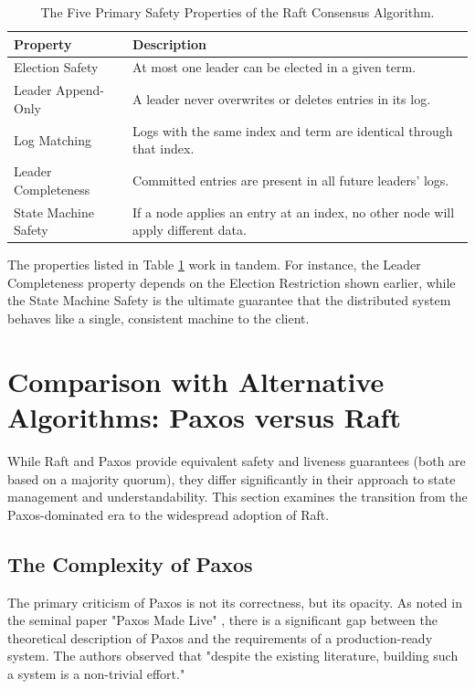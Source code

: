 \begin{table}[h]
\centering
\caption{The Five Primary Safety Properties of the Raft Consensus Algorithm.}
\label{tab:raft_safety_properties}
\begin{tabular}{|l|l|}
\hline
\textbf{Property} & \textbf{Description} \\ \hline
Election Safety & At most one leader can be elected in a given term. \\ \hline
Leader Append-Only & A leader never overwrites or deletes entries in its log. \\ \hline
Log Matching & Logs with the same index and term are identical through that index. \\ \hline
Leader Completeness & Committed entries are present in all future leaders' logs. \\ \hline
State Machine Safety & If a node applies an entry at an index, no other node will apply different data. \\ \hline
\end{tabular}
\end{table}

The properties listed in Table \ref{tab:raft_safety_properties} work in tandem. For instance, the Leader Completeness property depends on the Election Restriction shown earlier, while the State Machine Safety is the ultimate guarantee that the distributed system behaves like a single, consistent machine to the client.

\section{Comparison with Alternative Algorithms: Paxos versus Raft}
While Raft and Paxos provide equivalent safety and liveness guarantees (both are based on a majority quorum), they differ significantly in their approach to state management and understandability. This section examines the transition from the Paxos-dominated era to the widespread adoption of Raft.

\subsection{The Complexity of Paxos}
The primary criticism of Paxos is not its correctness, but its opacity. As noted in the seminal paper "Paxos Made Live" \cite{Chandra2007}, there is a significant gap between the theoretical description of Paxos and the requirements of a production-ready system. The authors observed that "despite the existing literature, building such a system is a non-trivial effort."

